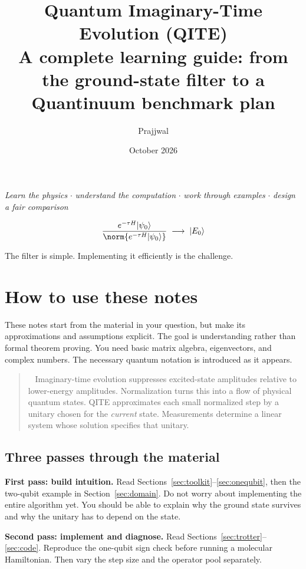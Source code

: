 \documentclass[11pt,a4paper]{article}
\title{Quantum Imaginary-Time Evolution (QITE)\\\large A complete learning guide: from the ground-state filter to a Quantinuum benchmark plan}
\author{Prajjwal}
\date{October 2026}
\newcommand{\ket}[1]{\lvert #1\rangle}
\newenvironment{idea}[1][Main idea]{\par\smallskip\begin{quotation}\noindent{\bfseries\textcolor{keyblue}{#1.}}\ }{\end{quotation}\smallskip}
\begin{document}
\maketitle
\begin{center}\small
\emph{Learn the physics} $\cdot$ \emph{understand the computation} $\cdot$ \emph{work through examples} $\cdot$ \emph{design a fair comparison}
\end{center}
\[
\frac{e^{-\tau H}\ket{\psi_0}}{\norm{e^{-\tau H}\ket{\psi_0}}}\;\longrightarrow\;\ket{E_0}
\]
\begin{center}The filter is simple. Implementing it efficiently is the challenge.\end{center}


\section*{How to use these notes}
These notes start from the material in your question, but make its approximations and assumptions explicit. The goal is understanding rather than formal theorem proving. You need basic matrix algebra, eigenvectors, and complex numbers. The necessary quantum notation is introduced as it appears.

\begin{idea}[The complete story in four sentences]
Imaginary-time evolution suppresses excited-state amplitudes relative to lower-energy amplitudes. Normalization turns this into a flow of physical quantum states. QITE approximates each small normalized step by a unitary chosen for the \emph{current} state. Measurements determine a linear system whose solution specifies that unitary.
\end{idea}

\subsection*{Three passes through the material}
\textbf{First pass: build intuition.} Read Sections~\ref{sec:toolkit}--\ref{sec:onequbit}, then the two-qubit example in Section~\ref{sec:domain}. Do not worry about implementing the entire algorithm yet. You should be able to explain why the ground state survives and why the unitary has to depend on the state.

\textbf{Second pass: implement and diagnose.} Read Sections~\ref{sec:trotter}--\ref{sec:code}. Reproduce the one-qubit sign check before running a molecular Hamiltonian. Then vary the step size and the operator pool separately.
\end{document}
